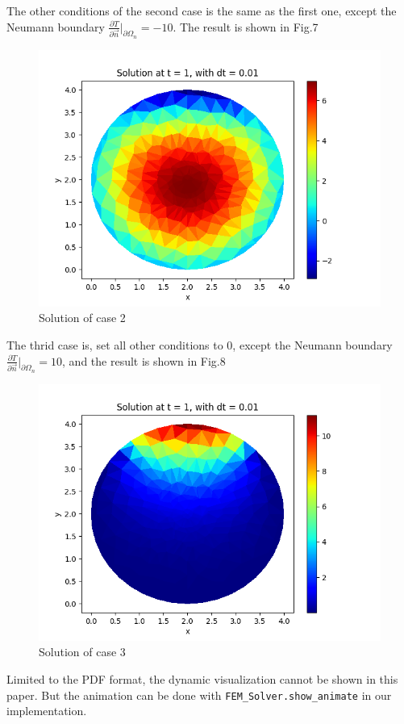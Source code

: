 \documentclass[conference]{IEEEtran}
\begin{document}
    The other conditions of the second case is the same as the first one, except the Neumann boundary 
    $\frac{\partial{T}}{\partial{\vec{n}}}\big |_{\partial{\Omega_n}} = -10$. The result is shown in Fig.7
    \begin{figure}[H]
        \centering
        \includegraphics[scale=0.4]{../fig/ext_10_neum_-10.png}
        \caption{Solution of case 2}
    \end{figure}
    The thrid case is, set all other conditions to 0, except the Neumann boundary $\frac{\partial{T}}{\partial{\vec{n}}}\big |_{\partial{\Omega_n}} = 10$,
    and the result is shown in Fig.8
    \begin{figure}[H]
        \centering
        \includegraphics[scale=0.4]{../fig/no_ext_neum_10.png}
        \caption{Solution of case 3}
    \end{figure}
    Limited to the PDF format, the dynamic visualization cannot be shown in this paper. But the animation can be 
    done with \texttt{FEM\_Solver.show\_animate} in our implementation.
\end{document}

